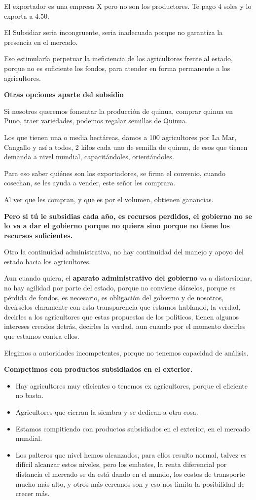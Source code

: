 \documentclass[
  letterpaper,
  DIV=11,
  numbers=noendperiod]{scrartcl}
\begin{document}
El exportador es una empresa X pero no son los productores. Te pago 4
soles y lo exporta a 4.50.

El Subsidiar seria incongruente, seria inadecuada porque no garantiza la
presencia en el mercado.

Eso estimularía perpetuar la ineficiencia de los agricultores frente al
estado, porque no es suficiente los fondos, para atender en forma
permanente a los agricultores.

\textbf{Otras opciones aparte del subsidio}

Si nosotros queremos fomentar la producción de quinua, comprar quinua en
Puno, traer variedades, podemos regalar semillas de Quinua.

Los que tienen una o media hectáreas, damos a 100 agricultores por La
Mar, Cangallo y así a todos, 2 kilos cada uno de semilla de quinua, de
esos que tienen demanda a nivel mundial, capacitándoles, orientándoles.

Para eso saber quiénes son los exportadores, se firma el convenio,
cuando cosechan, se les ayuda a vender, este señor les comprara.

Al ver que les compran, y que es por el volumen, obtienen ganancias.

\textbf{Pero si tú le subsidias cada año, es recursos perdidos, el
gobierno no se lo va a dar el gobierno porque no quiera sino porque no
tiene los recursos suficientes.}

Otro la continuidad administrativa, no hay continuidad del manejo y
apoyo del estado hacia los agricultores.

Aun cuando quiera, el \textbf{aparato administrativo del gobierno} va a
distorsionar, no hay agilidad por parte del estado, porque no conviene
dárselos, porque es pérdida de fondos, es necesario, es obligación del
gobierno y de nosotros, decírselos claramente con esta transparencia que
estamos hablando, la verdad, decirles a los agricultores que estas
propuestas de los políticos, tienen algunos intereses creados detrás,
decirles la verdad, aun cuando por el momento decirles que estamos
contra ellos.

Elegimos a autoridades incompetentes, porque no tenemos capacidad de
análisis.

\textbf{Competimos con productos subsidiados en el exterior.}

\begin{itemize}
\item
  Hay agricultores muy eficientes o tenemos ex agricultores, porque el
  eficiente no basta.
\item
  Agricultores que cierran la siembra y se dedican a otra cosa.
\item
  Estamos compitiendo con productos subsidiados en el exterior, en el
  mercado mundial.
\item
  Los palteros que nivel hemos alcanzados, para ellos resulto normal,
  talvez es difícil alcanzar estos niveles, pero los embates, la renta
  diferencial por distancia el mercado se da está dando en el mundo, los
  costos de transporte mucho más alto, y otros más cercanos son y eso
  nos limita la posibilidad de crecer más.
\end{itemize}
\end{document}
